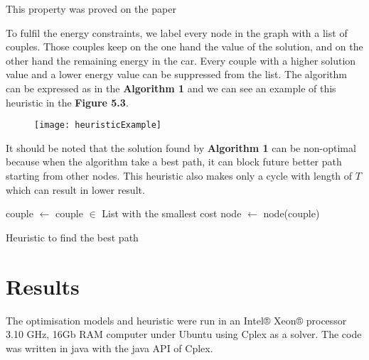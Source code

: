 \begin{bibunit}[ieeetr]
This property was proved on the paper \cite{carlier_optimization_2014b}

To fulfil the energy constraints, we label every node in the graph with a list of couples.
Those couples keep on the one hand the value of the solution, and on the other hand the remaining energy in the car.
Every couple with a higher solution value and a lower energy value can be suppressed from the list.
The algorithm can be expressed as in the \textbf{Algorithm 1} and we can see an example of this heuristic in the \textbf{Figure 5.3}.

\begin{figure}[!h]
\texttt{[image: heuristicExample]}
\end{figure}

It should be noted that the solution found by \textbf{Algorithm 1} can be non-optimal because when the algorithm take a best path, it can block future better path starting from other nodes. 
This heuristic also makes only a cycle with length of $T$ which can result in lower result.

\begin{algorithm}
\DontPrintSemicolon %
 {
couple $\gets$ couple $\in$ List with the smallest cost\;
 node $\gets$ node(couple)\;
}
\caption{Heuristic to find the best path}
\label{algo:max}
\end{algorithm}

\section{Results}
The optimisation models and heuristic were run in an Intel® Xeon® processor 3.10 GHz, 16Gb RAM computer under Ubuntu using Cplex as a solver.
The code was written in java with the java API of Cplex. 


\end{bibunit}
